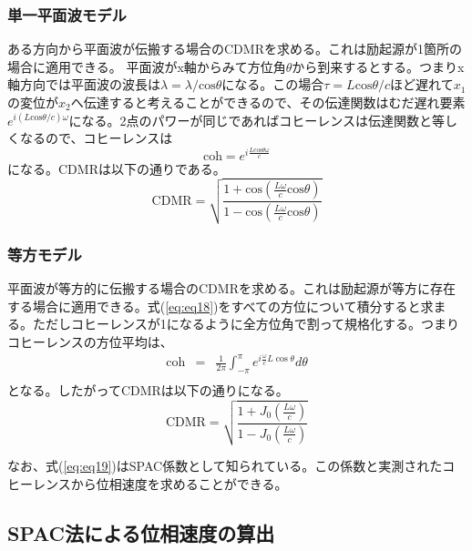 \documentclass[a4paper,12pt]{jsarticle}
\begin{document}
\subsubsection{単一平面波モデル}
ある方向から平面波が伝搬する場合のCDMRを求める。これは励起源が1箇所の場合に適用できる。
平面波がx軸からみて方位角$\theta$から到来するとする。つまりx軸方向では平面波の波長は$\lambda=\lambda/\mathrm{cos}\theta$になる。この場合$\tau=L\mathrm{cos}\theta/c$ほど遅れて$x_1$の変位が$x_2$へ伝達すると考えることができるので、その伝達関数はむだ遅れ要素$e^{i(L\mathrm{cos}\theta/c)\omega}$になる。2点のパワーが同じであればコヒーレンスは伝達関数と等しくなるので、コヒーレンスは
\begin{equation}
  \mathrm{coh}=e^{i\frac{L\mathrm{cos}\theta\omega}{c}}
\end{equation}
になる。CDMRは以下の通りである。
\begin{equation}  \label{eq:eq18}
  \mathrm{CDMR} = \sqrt{\frac{1+\mathrm{cos}(\frac{L\omega}{c}\mathrm{cos}\theta)}{1-\mathrm{cos}(\frac{L\omega}{c}\mathrm{cos}\theta)}}
\end{equation}



\subsubsection{等方モデル}
平面波が等方的に伝搬する場合のCDMRを求める。これは励起源が等方に存在する場合に適用できる。式(\ref{eq:eq18})をすべての方位について積分すると求まる。ただしコヒーレンスが1になるように全方位角で割って規格化する。つまりコヒーレンスの方位平均は、
\begin{eqnarray} \label{eq:eq19}
  \mathrm{coh} &=& \frac{1}{2\pi} \int_{-\pi}^{\pi} e^{i\frac{\omega}{c} L\cos \theta} d \theta \\
\end{eqnarray}
となる。したがってCDMRは以下の通りになる。
\begin{equation}  \label{eq:eq20}
  \mathrm{CDMR} = \sqrt{\frac{1+J_0(\frac{L\omega}{c})}{1-J_0(\frac{L\omega}{c})}}
\end{equation}

なお、式(\ref{eq:eq19})はSPAC係数として知られている。この係数と実測されたコヒーレンスから位相速度を求めることができる。

\subsection{SPAC法による位相速度の算出}
\end{document}
